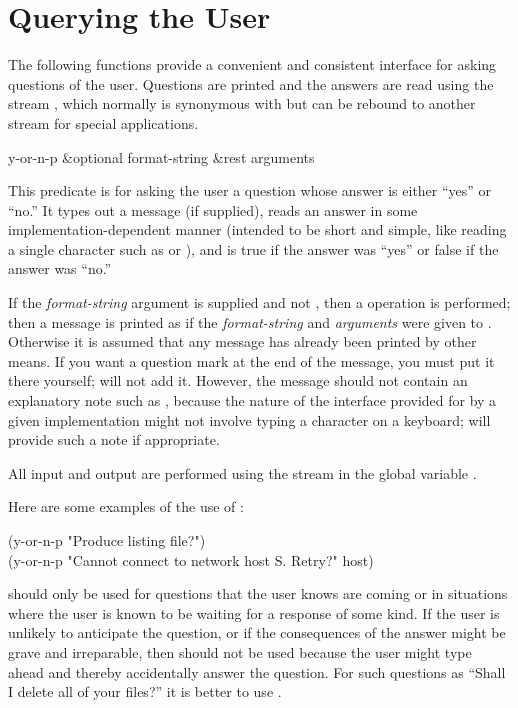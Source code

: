 \section{Querying the User}

The following functions provide a convenient and consistent interface for
asking questions of the user.  Questions are printed and the answers are
read using the stream , which normally is synonymous with
 but can be rebound to another stream for special
applications.

\begin{defun}[Function]
y-or-n-p &optional format-string &rest arguments

This predicate is for asking the user a question whose answer is either
``yes'' or ``no.''  It types out a message (if supplied), reads an answer
in some implementation-dependent manner (intended to be short and simple,
like reading a single character such as  or ), and is
true if the answer was ``yes'' or false if the answer was ``no.''

If the {\it format-string} argument is supplied and not {\false},
then a  operation is performed; then
a message is printed as if the {\it format-string} and {\it arguments}
were given to .
Otherwise it is assumed that any message has already been printed
by other means.
If you want a question mark at the end of the message,
you must put it there yourself;  will not add it.
However, the message should not contain an explanatory note such
as , because the nature of the interface provided for
 by a given implementation might not involve typing a
character on a keyboard;  will provide such a note
if appropriate.

All input and output are performed using the stream in the global
variable .

Here are some examples of the use of :
\begin{lisp}
(y-or-n-p "Produce listing file?") \\
(y-or-n-p "Cannot connect to network host {\Xtilde}S.  Retry?" host)
\end{lisp}

 should only be used for questions that the user knows
are coming or in situations where the user is known to be waiting for
a response of some kind.
If the user is unlikely to anticipate the question,
or if the consequences of the answer might be grave and irreparable,
then  should not be used because the user might type ahead
and thereby accidentally answer the question.
For such questions as ``Shall I delete all of your files?'' it is better to use
.
\end{defun}

